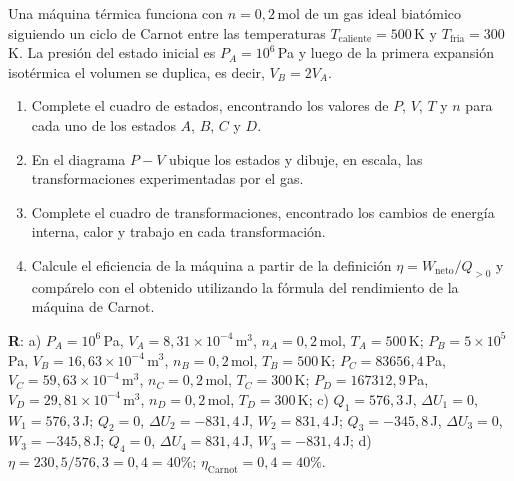 \documentclass[a4paper,12pt]{article}
\begin{document}
\begin{enumerate}
		Una máquina térmica funciona con $n=0,2$\,mol de un gas ideal biatómico
		siguiendo un ciclo de Carnot entre las temperaturas
		$T_{\mathrm{caliente}}=500$\,K y $T_{\mathrm{fria}}=300$\,K. La presión
		del estado inicial es $P_A=10^6$\,Pa y luego de la primera expansión
		isotérmica el volumen se duplica, es decir, $V_B = 2 V_A$.
		\begin{enumerate}
			\item Complete el cuadro de estados, encontrando los valores de
				$P$, $V$, $T$ y $n$ para cada uno de los estados $A$, $B$, $C$
				y $D$. 
			\item En el diagrama $P-V$ ubique los estados y dibuje, en escala,
				las transformaciones experimentadas por el gas.
			\item Complete el cuadro de transformaciones, encontrado los
				cambios de energía interna, calor y trabajo en cada
				transformación.
			\item Calcule el eficiencia de la máquina a partir de la definición
				$\eta=W_{\mathrm{neto}} / Q_{>0}$ y compárelo con el obtenido
				utilizando la fórmula del rendimiento de la máquina de Carnot. 
		\end{enumerate}
		{\bf{R}}: a) 
		$P_A=10^6$\,Pa, $V_A=8,31\times10^{-4}$\,m$^3$, $n_A=0,2$\,mol,
		$T_A=500$\,K; $P_B=5\times 10^5$\,Pa, $V_B=16,63\times10^{-4}$\,m$^3$,
		$n_B=0,2$\,mol, $T_B=500$\,K; $P_C=83656,4$\,Pa,
		$V_C=59,63\times10^{-4}$\,m$^3$, $n_C=0,2$\,mol, $T_C=300$\,K;
		$P_D=167312,9$\,Pa, $V_D=29,81\times10^{-4}$\,m$^3$, $n_D=0,2$\,mol,
		$T_D=300$\,K; c) $Q_1=576,3$\,J, $\Delta U_1=0$, $W_1=576,3$\,J;
		$Q_2=0$, $\Delta U_2=-831,4$\,J, $W_2=831,4$\,J; $Q_3=-345,8$\,J,
		$\Delta U_3=0$, $W_3=-345,8$\,J; $Q_4=0$, $\Delta U_4=831,4$\,J,
		$W_3=-831,4$\,J; d) $\eta=230,5/576,3 = 0,4 = 40\%$;
		$\eta_{\mathrm{Carnot}} = 0,4 = 40\%$.
\end{enumerate}
\end{document}
